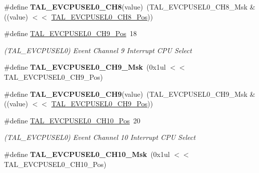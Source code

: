 \begin{DoxyCompactItemize}
\item 
\hypertarget{group___s_a_m_l21___t_a_l_gaa9aba88f3090ec861670eda02c6aa7c6}{}\#define {\bfseries T\+A\+L\+\_\+\+E\+V\+C\+P\+U\+S\+E\+L0\+\_\+\+C\+H8}(value)~(T\+A\+L\+\_\+\+E\+V\+C\+P\+U\+S\+E\+L0\+\_\+\+C\+H8\+\_\+\+Msk \& ((value) $<$$<$ \hyperlink{group___s_a_m_l21___t_a_l_ga646064d1b5945df4c3ae3271acfa7f17}{T\+A\+L\+\_\+\+E\+V\+C\+P\+U\+S\+E\+L0\+\_\+\+C\+H8\+\_\+\+Pos}))\label{group___s_a_m_l21___t_a_l_gaa9aba88f3090ec861670eda02c6aa7c6}

\item 
\hypertarget{group___s_a_m_l21___t_a_l_ga265332bbe70ab748952a850b1172f21f}{}\#define \hyperlink{group___s_a_m_l21___t_a_l_ga265332bbe70ab748952a850b1172f21f}{T\+A\+L\+\_\+\+E\+V\+C\+P\+U\+S\+E\+L0\+\_\+\+C\+H9\+\_\+\+Pos}~18\label{group___s_a_m_l21___t_a_l_ga265332bbe70ab748952a850b1172f21f}

\begin{DoxyCompactList}\small\item\em (T\+A\+L\+\_\+\+E\+V\+C\+P\+U\+S\+E\+L0) Event Channel 9 Interrupt C\+P\+U Select \end{DoxyCompactList}\item 
\hypertarget{group___s_a_m_l21___t_a_l_ga9fba4f489b0f19476f309eba24b8dbb1}{}\#define {\bfseries T\+A\+L\+\_\+\+E\+V\+C\+P\+U\+S\+E\+L0\+\_\+\+C\+H9\+\_\+\+Msk}~(0x1ul $<$$<$ T\+A\+L\+\_\+\+E\+V\+C\+P\+U\+S\+E\+L0\+\_\+\+C\+H9\+\_\+\+Pos)\label{group___s_a_m_l21___t_a_l_ga9fba4f489b0f19476f309eba24b8dbb1}

\item 
\hypertarget{group___s_a_m_l21___t_a_l_ga9e61fa16484a927eb8943aec1daea60f}{}\#define {\bfseries T\+A\+L\+\_\+\+E\+V\+C\+P\+U\+S\+E\+L0\+\_\+\+C\+H9}(value)~(T\+A\+L\+\_\+\+E\+V\+C\+P\+U\+S\+E\+L0\+\_\+\+C\+H9\+\_\+\+Msk \& ((value) $<$$<$ \hyperlink{group___s_a_m_l21___t_a_l_ga265332bbe70ab748952a850b1172f21f}{T\+A\+L\+\_\+\+E\+V\+C\+P\+U\+S\+E\+L0\+\_\+\+C\+H9\+\_\+\+Pos}))\label{group___s_a_m_l21___t_a_l_ga9e61fa16484a927eb8943aec1daea60f}

\item 
\hypertarget{group___s_a_m_l21___t_a_l_gafe882dfb8dadefeb38ade0308c39e5f1}{}\#define \hyperlink{group___s_a_m_l21___t_a_l_gafe882dfb8dadefeb38ade0308c39e5f1}{T\+A\+L\+\_\+\+E\+V\+C\+P\+U\+S\+E\+L0\+\_\+\+C\+H10\+\_\+\+Pos}~20\label{group___s_a_m_l21___t_a_l_gafe882dfb8dadefeb38ade0308c39e5f1}

\begin{DoxyCompactList}\small\item\em (T\+A\+L\+\_\+\+E\+V\+C\+P\+U\+S\+E\+L0) Event Channel 10 Interrupt C\+P\+U Select \end{DoxyCompactList}\item 
\hypertarget{group___s_a_m_l21___t_a_l_ga7c3603df506238f4a5a8e3b188f489be}{}\#define {\bfseries T\+A\+L\+\_\+\+E\+V\+C\+P\+U\+S\+E\+L0\+\_\+\+C\+H10\+\_\+\+Msk}~(0x1ul $<$$<$ T\+A\+L\+\_\+\+E\+V\+C\+P\+U\+S\+E\+L0\+\_\+\+C\+H10\+\_\+\+Pos)\label{group___s_a_m_l21___t_a_l_ga7c3603df506238f4a5a8e3b188f489be}


\end{DoxyCompactItemize}
